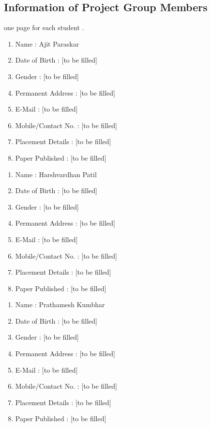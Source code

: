 \documentclass[oneside,a4paper,12pt]{report}
\begin{document}
\begin{appendices}
\chapter{Information of Project Group Members}
one page for each student .
\newpage
\begin{enumerate}
\item Name : Ajit Paraskar \hspace{60 mm}\fbox{\parbox[c][75pt][c]{60pt}{\centering\scriptsize [Photo]}}
\item Date of Birth : [to be filled]
\item Gender : [to be filled]
\item Permanent Address : [to be filled]
\item E-Mail : [to be filled]
\item Mobile/Contact No. : [to be filled]
\item Placement Details : [to be filled]
\item Paper Published : [to be filled]

\end{enumerate}
\newpage
\begin{enumerate}
\item Name : Harshvardhan Patil \hspace{52 mm}\fbox{\parbox[c][75pt][c]{60pt}{\centering\scriptsize [Photo]}}
\item Date of Birth : [to be filled]
\item Gender : [to be filled]
\item Permanent Address : [to be filled]
\item E-Mail : [to be filled]
\item Mobile/Contact No. : [to be filled]
\item Placement Details : [to be filled]
\item Paper Published : [to be filled]

\end{enumerate}
\newpage
\begin{enumerate}
\item Name : Prathamesh Kumbhar \hspace{50 mm}\fbox{\parbox[c][75pt][c]{60pt}{\centering\scriptsize [Photo]}}
\item Date of Birth : [to be filled]
\item Gender : [to be filled]
\item Permanent Address : [to be filled]
\item E-Mail : [to be filled]
\item Mobile/Contact No. : [to be filled]
\item Placement Details : [to be filled]
\item Paper Published : [to be filled]


\end{enumerate}
\end{appendices}
\end{document}
